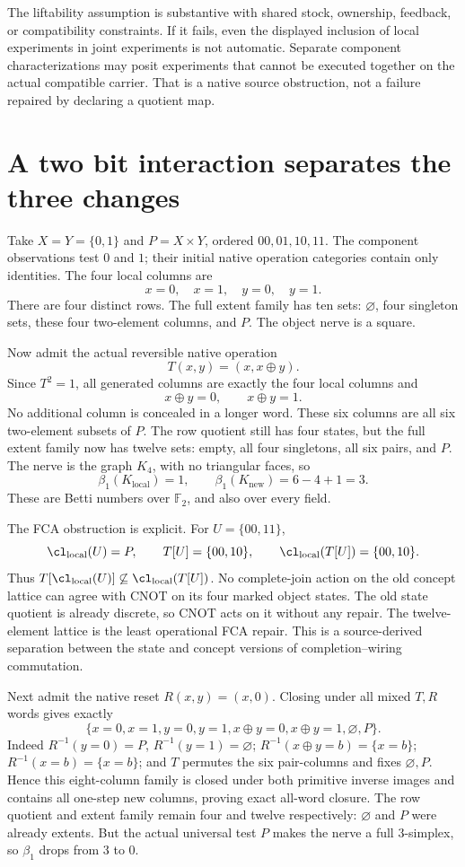 The liftability assumption is substantive with shared stock, ownership,
feedback, or compatibility constraints. If it fails, even the displayed
inclusion of local experiments in joint experiments is not automatic.
Separate component characterizations may posit experiments that cannot
be executed together on the actual compatible carrier. That is a native
source obstruction, not a failure repaired by declaring a quotient map.

\section{A two bit interaction separates the three changes}\label{sec:cnot}
Take $X=Y=\{0,1\}$ and $P=X\times Y$, ordered $00,01,10,11$.
The component observations test $0$ and $1$; their initial native
operation categories contain only identities. The four local columns
are
\[
 x=0,\quad x=1,\quad y=0,\quad y=1.
\]
There are four distinct rows. The full extent family has ten sets:
$\varnothing$, four singleton sets, these four two-element columns,
and $P$. The object nerve is a square.

Now admit the actual reversible native operation
\[
 T(x,y)=(x,x\oplus y).
\]
Since $T^2=1$, all generated columns are exactly the four local columns
and
\[
 x\oplus y=0,\qquad x\oplus y=1.
\]
No additional column is concealed in a longer word. These six columns
are all six two-element subsets of $P$. The row quotient still has
four states, but the full extent family now has twelve sets: empty,
all four singletons, all six pairs, and $P$. The nerve is the graph
$K_4$, with no triangular faces, so
\[
 \beta_1(K_{\mathrm{local}})=1,
 \qquad \beta_1(K_{\mathrm{new}})=6-4+1=3.
\]
These are Betti numbers over $\mathbb F_2$, and also over every field.

The FCA obstruction is explicit. For $U=\{00,11\}$,
\[
 \cl_{\mathrm{local}}(U)=P,
 \qquad
 T[U]=\{00,10\},
 \qquad
 \cl_{\mathrm{local}}(T[U])=\{00,10\}.
\]
Thus $T[\cl_{\mathrm{local}}(U)]\not\subseteq
\cl_{\mathrm{local}}(T[U])$. No complete-join action on the old
concept lattice can agree with CNOT on its four marked object states.
The old state quotient is already discrete, so CNOT acts on it without
any repair. The twelve-element lattice is the least operational FCA
repair. This is a source-derived separation between the state and
concept versions of completion--wiring commutation.

Next admit the native reset $R(x,y)=(x,0)$. Closing under all mixed
$T,R$ words gives exactly
\[
 \{x=0,x=1,y=0,y=1,x\oplus y=0,x\oplus y=1,\varnothing,P\}.
\]
Indeed $R^{-1}(y=0)=P$, $R^{-1}(y=1)=\varnothing$;
$R^{-1}(x\oplus y=b)=\{x=b\}$;
$R^{-1}(x=b)=\{x=b\}$; and $T$ permutes the six pair-columns
and fixes $\varnothing,P$. Hence this eight-column family is closed
under both primitive inverse images and contains all one-step new
columns, proving exact all-word closure. The row quotient and extent
family remain four and twelve respectively: $\varnothing$ and $P$
were already extents. But the actual universal test $P$ makes the
nerve a full $3$-simplex, so $\beta_1$ drops from $3$ to $0$.

